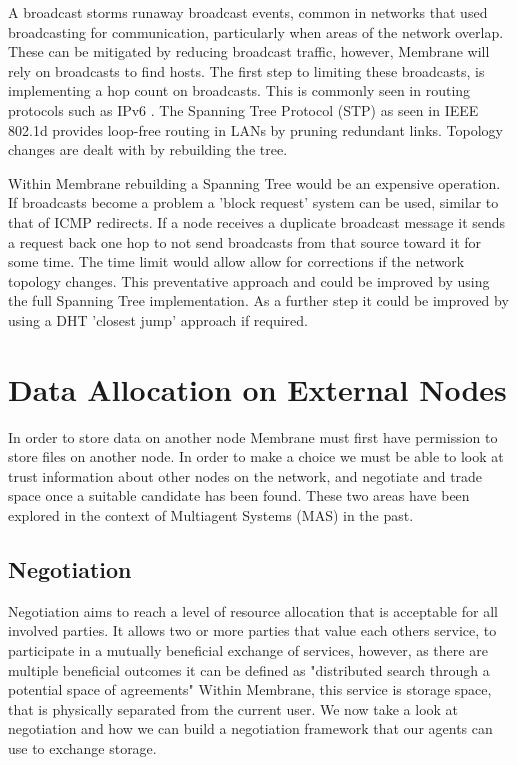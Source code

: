 \documentclass[11pt, a4paper, twocolumn, twoside]{report}
\begin{document}
A broadcast storms runaway broadcast events, common in networks that used broadcasting for communication, particularly when areas of the network overlap. \citep{Tseng:2002:BSP:506900.506905} These can be mitigated by reducing broadcast traffic, however, Membrane will rely on broadcasts to find hosts. The first step to limiting these broadcasts, is implementing a hop count on broadcasts. This is commonly seen in routing protocols such as IPv6 \citep{deering1998internet}. The Spanning Tree Protocol (STP) as seen in IEEE 802.1d \citep*{ieee802ieee, sharma2004viking} provides loop-free routing in LANs by pruning redundant links. Topology changes are dealt with by rebuilding the tree.

Within Membrane rebuilding a Spanning Tree would be an expensive operation. If broadcasts become a problem a 'block request' system can be used, similar to that of ICMP redirects. \citep{postel1981rfc} If a node receives a duplicate broadcast message it sends a request back one hop to not send broadcasts from that source toward it for  some time. The time limit would allow allow for corrections if the network topology changes. This preventative approach and could be improved by using the full Spanning Tree implementation. As a further step it could be improved by using a DHT 'closest jump' approach if required.

\section{Data Allocation on External Nodes}

In order to store data on another node Membrane must first have permission to store files on another node. In order to make a choice we must be able to look at trust information about other nodes on the network, and negotiate and trade space once a suitable candidate has been found. These two areas have been explored in the context of Multiagent Systems (MAS) in the past. \citep{wooldridge2009introduction}

\subsection{Negotiation} \label{sec:neg}

Negotiation aims to reach a level of resource allocation that is acceptable for all involved parties. \citep{rahwan2005interest} It allows two or more parties that value each others service, to participate in a mutually beneficial exchange of services, however, as there are multiple beneficial outcomes it can be defined as "distributed search through a potential space of agreements" \citep{jennings2001automated} Within Membrane, this service is storage space, that is physically separated from the current user. We now take a look at negotiation and how we can build a negotiation framework that our agents can use to exchange storage.
\end{document}
